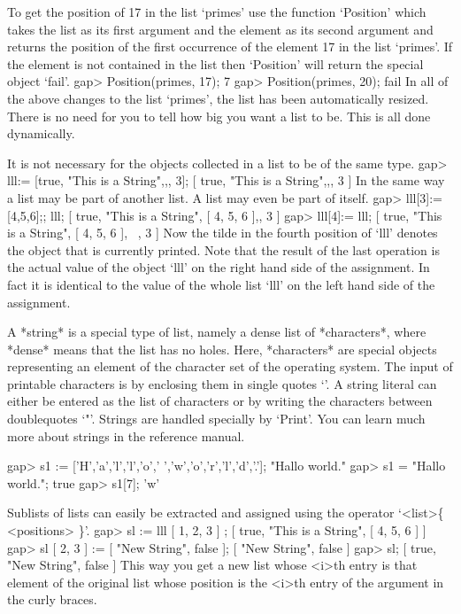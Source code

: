 To get the position    of 17 in  the   list  `primes' use   the  function
`Position' which takes the list as its  first argument and the element as
its second argument  and returns the position of  the first occurrence of
the element 17 in the list `primes'.
If the element is not contained in the list then `Position' will return
the special object `fail'.
\beginexample
gap> Position(primes, 17);
7
gap> Position(primes, 20);
fail
\endexample
In  all  of the  above changes to  the  list `primes',  the list has been
automatically resized.  There  is no need  for you to tell {\GAP} how big
you want a list to be.  This is all done dynamically.

It is not necessary for the objects collected in a list to be of the same
type.
\beginexample
gap> lll:= [true, "This is a String",,, 3];
[ true, "This is a String",,, 3 ]
\endexample
In the same way a list may be part of another  list.  A list  may even be
part of itself.
\beginexample
gap> lll[3]:= [4,5,6];; lll;
[ true, "This is a String", [ 4, 5, 6 ],, 3 ]
gap> lll[4]:= lll;
[ true, "This is a String", [ 4, 5, 6 ], ~, 3 ]
\endexample
Now the tilde in the fourth position of `lll'  denotes the object that is
currently  printed. Note that  the result  of the  last operation is  the
actual value  of  the  object  `lll'   on  the  right  hand side  of  the
assignment. In  fact it is  identical to the value  of the whole list
`lll' on the left hand side of the assignment.

A *string*  is a  special type  of list,
namely a dense  list of *characters*, where *dense* means  that the list has
no  holes. Here,  *characters* are  special {\GAP}  objects representing  an
element of the character set of the operating system. The input of printable
characters is  by enclosing them in  single quotes `\pif'. A  string literal
can either be entered as the list of characters or by writing the characters
between doublequotes `"'. Strings are  handled specially by `Print'. You can
learn much more about strings in the reference manual.

\beginexample
gap> s1 := ['H','a','l','l','o',' ','w','o','r','l','d','.'];
"Hallo world."
gap> s1 = "Hallo world.";
true
gap> s1[7];
'w'
\endexample

Sublists of lists can easily be extracted and assigned using the operator
`<list>\{ <positions> \}'.
\beginexample
gap> sl := lll{ [ 1, 2, 3 ] };
[ true, "This is a String", [ 4, 5, 6 ] ]
gap> sl{ [ 2, 3 ] } := [ "New String", false ];
[ "New String", false ]
gap> sl;
[ true, "New String", false ]
\endexample
This way you get a new list whose <i>th entry is that element of the
original list whose position is the <i>th entry of the argument in the
curly braces.

